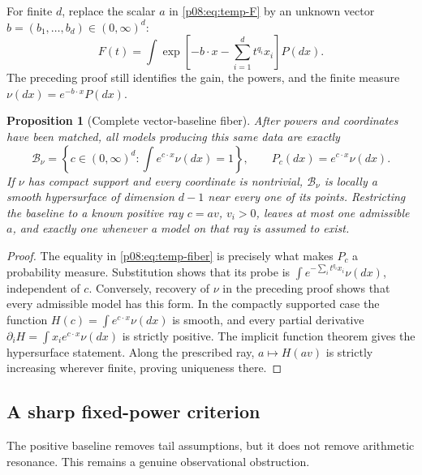 \documentclass[11pt,letterpaper]{article}
\newtheorem{proposition}[theorem]{Proposition}
\theoremstyle{definition}
\theoremstyle{remark}
\newcommand{\1}{\mathbf 1}
\begin{document}
For finite $d$, replace the scalar $a$ in \eqref{p08:eq:temp-F} by an
unknown vector $b=(b_1,\ldots,b_d)\in(0,\infty)^d$:
\[
 F(t)=\int\exp\left[-b\cdot x-\sum_{i=1}^dt^{q_i}x_i\right]P(dx).
\]
The preceding proof still identifies the gain, the powers, and the
finite measure $\nu(dx)=e^{-b\cdot x}P(dx)$.

\begin{proposition}[Complete vector-baseline fiber]
\label{p08:prop:temp-vector-fiber}
After powers and coordinates have been matched, all models producing
this same data are exactly
\begin{equation}\label{p08:eq:temp-fiber}
 \mathcal B_\nu=\left\{c\in(0,\infty)^d:
                      \int e^{c\cdot x}\nu(dx)=1\right\},
       \qquad P_c(dx)=e^{c\cdot x}\nu(dx).
\end{equation}
If $\nu$ has compact support and every coordinate is nontrivial,
$\mathcal B_\nu$ is locally a smooth hypersurface of dimension $d-1$
near every one of its points. Restricting the baseline to a known
positive ray $c=av$, $v_i>0$, leaves at most one admissible $a$, and
exactly one whenever a model on that ray is assumed to exist.
\end{proposition}
\begin{proof}
The equality in \eqref{p08:eq:temp-fiber} is precisely what makes $P_c$
a probability measure. Substitution shows that its probe is
$\int e^{-\sum_i t^{q_i}x_i}\nu(dx)$, independent of $c$.
Conversely, recovery of $\nu$ in the preceding proof shows that every
admissible model has this form. In the compactly supported case the
function $H(c)=\int e^{c\cdot x}\nu(dx)$ is smooth, and every partial
derivative $\partial_iH=\int x_i e^{c\cdot x}\nu(dx)$ is strictly
positive. The implicit function theorem gives the hypersurface
statement. Along the prescribed ray, $a\mapsto H(av)$ is strictly
increasing wherever finite, proving uniqueness there.
\end{proof}

\subsection{A sharp fixed-power criterion}

The positive baseline removes tail assumptions, but it does not remove
arithmetic resonance. This remains a genuine observational obstruction.
\end{document}
